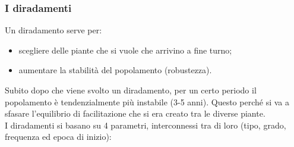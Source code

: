 \subsubsection{I diradamenti}
Un diradamento serve per:
\begin{itemize}[nosep]
    \item scegliere delle piante che si vuole che arrivino a fine turno;
    \item aumentare la stabilità del popolamento (robustezza).
\end{itemize}
Subito dopo che viene svolto un diradamento, per un certo periodo il popolamento è tendenzialmente più instabile (3-5 anni). Questo perché si va a sfasare l'equilibrio di facilitazione che si era creato tra le diverse piante.\\
I diradamenti si basano su 4 parametri, interconnessi tra di loro (tipo, grado, frequenza ed epoca di inizio):
